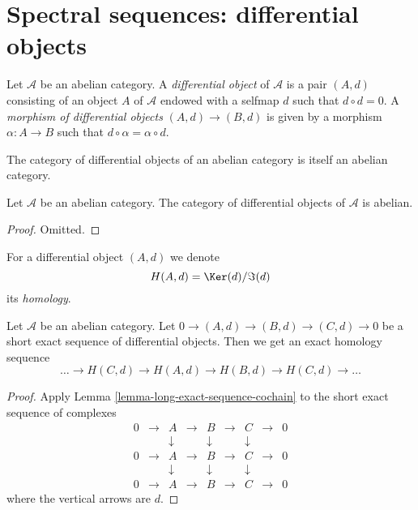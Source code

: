 \section{Spectral sequences: differential objects}
\label{section-differential-object}

\begin{definition}
\label{definition-differential-object}
Let $\mathcal{A}$ be an abelian category.
A {\it differential object} of $\mathcal{A}$
is a pair $(A, d)$ consisting of an
object $A$ of $\mathcal{A}$
endowed with a selfmap $d$ such that $d \circ d = 0$.
A {\it morphism of differential objects} $(A, d) \to (B, d)$
is given by a morphism $\alpha : A \to B$ such that
$d \circ \alpha = \alpha \circ d$.
\end{definition}

\begin{lemma}
\label{lemma-differential-objects-abelian}
\begin{slogan}
The category of differential objects of an abelian category is itself
an abelian category.
\end{slogan}
Let $\mathcal{A}$ be an abelian category.
The category of differential objects of $\mathcal{A}$ is abelian.
\end{lemma}

\begin{proof}
Omitted.
\end{proof}

\begin{definition}
\label{definition-differential-object-homology}
For a differential object $(A, d)$ we denote
$$
H(A, d) = \Ker(d)/\Im(d)
$$
its {\it homology}.
\end{definition}

\begin{lemma}
\label{lemma-differential-objects-ses}
Let $\mathcal{A}$ be an abelian category.
Let $0 \to (A, d) \to (B, d) \to (C, d) \to 0$ be a short exact sequence
of differential objects. Then we get an exact homology sequence
$$
\ldots \to H(C, d) \to H(A, d) \to H(B, d) \to H(C, d) \to \ldots
$$
\end{lemma}

\begin{proof}
Apply Lemma \ref{lemma-long-exact-sequence-cochain}
to the short exact sequence of complexes
$$
\begin{matrix}
0 & \to & A & \to & B & \to & C & \to & 0 \\
& & \downarrow & & \downarrow & & \downarrow \\
0 & \to & A & \to & B & \to & C & \to & 0 \\
& & \downarrow & & \downarrow & & \downarrow \\
0 & \to & A & \to & B & \to & C & \to & 0
\end{matrix}
$$
where the vertical arrows are $d$.
\end{proof}

